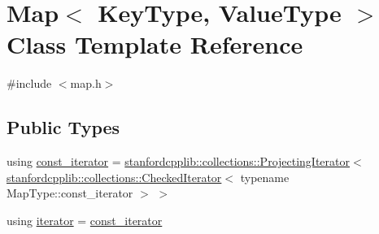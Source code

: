 \hypertarget{classMap}{}\section{Map$<$ Key\+Type, Value\+Type $>$ Class Template Reference}
\label{classMap}


{\ttfamily \#include $<$map.\+h$>$}

\subsection*{Public Types}
\begin{DoxyCompactItemize}
\item 
using \mbox{\hyperlink{classMap_a04e3b848cce2bbfed5ea818e1b264000}{const\+\_\+iterator}} = \mbox{\hyperlink{classstanfordcpplib_1_1collections_1_1ProjectingIterator}{stanfordcpplib\+::collections\+::\+Projecting\+Iterator}}$<$ \mbox{\hyperlink{classstanfordcpplib_1_1collections_1_1CheckedIterator}{stanfordcpplib\+::collections\+::\+Checked\+Iterator}}$<$ typename Map\+Type\+::const\+\_\+iterator $>$ $>$
\item 
using \mbox{\hyperlink{classMap_ab3d10e70baaeac78e76b7abae7e2cf76}{iterator}} = \mbox{\hyperlink{classMap_a04e3b848cce2bbfed5ea818e1b264000}{const\+\_\+iterator}}
\end{DoxyCompactItemize}
